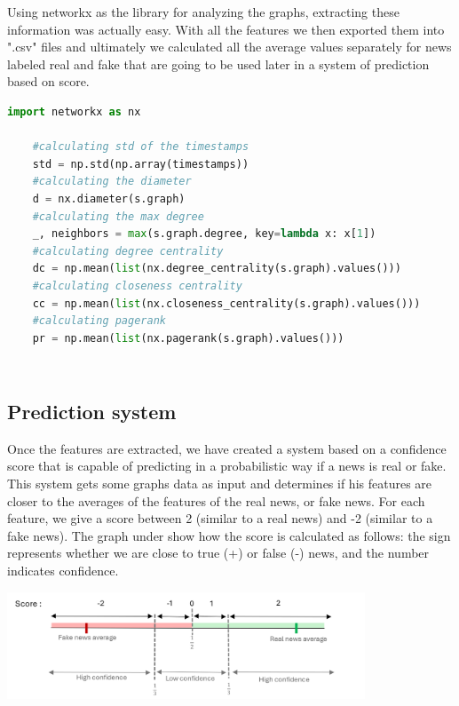 \documentclass[11pt,a4paper]{article}
\begin{document}
Using networkx\cite{networkx} as the library for analyzing the graphs, extracting these information was actually easy. With all the features we then exported them into ".csv" files and ultimately we calculated all the average values separately for news labeled real and fake that are going to be used later in a system of prediction based on score.

\begin{lstlisting}[language=Python]
    import networkx as nx

    #calculating std of the timestamps
    std = np.std(np.array(timestamps))
    #calculating the diameter
    d = nx.diameter(s.graph)
    #calculating the max degree
    _, neighbors = max(s.graph.degree, key=lambda x: x[1])
    #calculating degree centrality
    dc = np.mean(list(nx.degree_centrality(s.graph).values()))
    #calculating closeness centrality
    cc = np.mean(list(nx.closeness_centrality(s.graph).values()))
    #calculating pagerank
    pr = np.mean(list(nx.pagerank(s.graph).values()))
\end{lstlisting}


\subsection*{\\Prediction system}

Once the features are extracted, we have created a system based on a confidence score that is
capable of predicting in a probabilistic way if a news is real or fake. This system gets some
graphs data as input and determines if his features are closer to the averages of the features of
the real news, or fake news.
For each feature, we give a score between 2 (similar to a real news) and -2 (similar to a fake
news). The graph under show how the score is calculated as follows: the sign represents
whether we are close to true (+) or false (-) news, and the number indicates confidence.

\begin{center}
    \includegraphics[width=0.8\textwidth]{predictor_score_graph}
\end{center}
\end{document}
